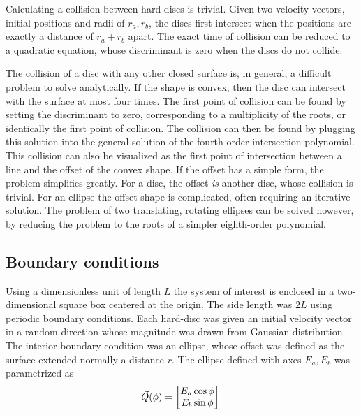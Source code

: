 Calculating a collision between hard-discs is trivial. Given two velocity vectors, initial positions and radii of $r_a, r_b$, the discs first intersect when the positions are exactly a distance of $r_a + r_b$ apart. The exact time of collision can be reduced to a quadratic equation, whose discriminant is zero when the discs do not collide.

The collision of a disc with any other closed surface is, in general, a difficult problem to solve analytically. If the shape is convex, then the disc can intersect with the surface at most four times. The first point of collision can be found by setting the discriminant to zero, corresponding to a multiplicity of the roots, or identically the first point of collision. The collision can then be found by plugging this solution into the general solution of the fourth order intersection polynomial. This collision can also be visualized as the first point of intersection between a line and the offset of the convex shape. If the offset has a simple form, the problem simplifies greatly. For a disc, the offset \textit{is} another disc, whose collision is trivial. For an ellipse the offset shape is complicated, often requiring an iterative solution. The problem of two translating, rotating ellipses can be solved however, by reducing the problem to the roots of a simpler eighth-order polynomial.\cite{yi-king_choi_continuous_2006}

\subsection{Boundary conditions}
Using a dimensionless unit of length $L$ the system of interest is enclosed in a two-dimensional square box centered at the origin. The side length was $2L$ using periodic boundary conditions. Each hard-disc was given an initial velocity vector in a random direction whose magnitude was drawn from Gaussian distribution. The interior boundary condition was an ellipse, whose offset was defined as the surface extended normally a distance $r$. The ellipse defined with axes $E_a,E_b$ was parametrized as
%
\begin{equation}
\vec Q(\phi) = \begin{bmatrix}
	E_a \cos \phi \\
	E_b \sin \phi \\ 
\end{bmatrix} \\
\end{equation}

